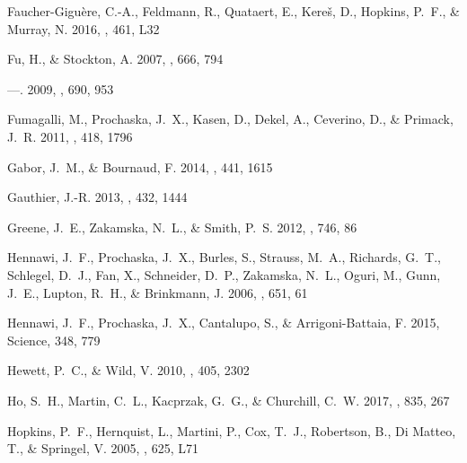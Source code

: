 \documentclass[iop]{emulateapj}
\begin{document}
\begin{thebibliography}{61}
{Faucher-Gigu{\`e}re}, C.-A., {Feldmann}, R., {Quataert}, E., {Kere{\v s}}, D.,
  {Hopkins}, P.~F., \& {Murray}, N. 2016, \mnras, 461, L32

{Fu}, H., \& {Stockton}, A. 2007, \apj, 666, 794

---. 2009, \apj, 690, 953

{Fumagalli}, M., {Prochaska}, J.~X., {Kasen}, D., {Dekel}, A., {Ceverino}, D.,
  \& {Primack}, J.~R. 2011, \mnras, 418, 1796

{Gabor}, J.~M., \& {Bournaud}, F. 2014, \mnras, 441, 1615

{Gauthier}, J.-R. 2013, \mnras, 432, 1444

{Greene}, J.~E., {Zakamska}, N.~L., \& {Smith}, P.~S. 2012, \apj, 746, 86

{Hennawi}, J.~F., {Prochaska}, J.~X., {Burles}, S., {Strauss}, M.~A.,
  {Richards}, G.~T., {Schlegel}, D.~J., {Fan}, X., {Schneider}, D.~P.,
  {Zakamska}, N.~L., {Oguri}, M., {Gunn}, J.~E., {Lupton}, R.~H., \&
  {Brinkmann}, J. 2006, \apj, 651, 61

{Hennawi}, J.~F., {Prochaska}, J.~X., {Cantalupo}, S., \& {Arrigoni-Battaia},
  F. 2015, Science, 348, 779

{Hewett}, P.~C., \& {Wild}, V. 2010, \mnras, 405, 2302

{Ho}, S.~H., {Martin}, C.~L., {Kacprzak}, G.~G., \& {Churchill}, C.~W. 2017,
  \apj, 835, 267

{Hopkins}, P.~F., {Hernquist}, L., {Martini}, P., {Cox}, T.~J., {Robertson},
  B., {Di Matteo}, T., \& {Springel}, V. 2005, \apjl, 625, L71


\end{thebibliography}
\end{document}
